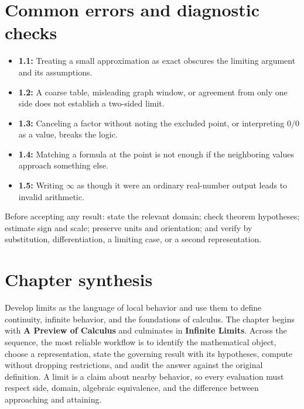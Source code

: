 \documentclass[11pt]{article}
\begin{document}
\section{Common errors and diagnostic checks}
\begin{warningbox}
\begin{itemize}
\item \textbf{1.1:} Treating a small approximation as exact obscures the limiting argument and its assumptions.
\item \textbf{1.2:} A coarse table, misleading graph window, or agreement from only one side does not establish a two-sided limit.
\item \textbf{1.3:} Canceling a factor without noting the excluded point, or interpreting $0/0$ as a value, breaks the logic.
\item \textbf{1.4:} Matching a formula at the point is not enough if the neighboring values approach something else.
\item \textbf{1.5:} Writing $\infty$ as though it were an ordinary real-number output leads to invalid arithmetic.
\end{itemize}
\end{warningbox}
\begin{checkbox}
Before accepting any result: state the relevant domain; check theorem hypotheses; estimate sign and scale; preserve units and orientation; and verify by substitution, differentiation, a limiting case, or a second representation.
\end{checkbox}

\section{Chapter synthesis}
Develop limits as the language of local behavior and use them to define continuity, infinite behavior, and the foundations of calculus. The chapter begins with \textbf{A Preview of Calculus} and culminates in \textbf{Infinite Limits}. Across the sequence, the most reliable workflow is to identify the mathematical object, choose a representation, state the governing result with its hypotheses, compute without dropping restrictions, and audit the answer against the original definition. A limit is a claim about nearby behavior, so every evaluation must respect side, domain, algebraic equivalence, and the difference between approaching and attaining.
\end{document}
